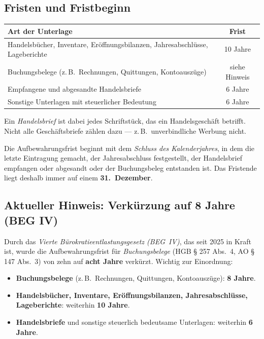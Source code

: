 \documentclass[11pt, a4paper]{article}
\begin{document}
\subsection{Fristen und Fristbeginn}

\begin{center}
\begin{tabular}{p{8.6cm} c}
\toprule
\textbf{Art der Unterlage} & \textbf{Frist}\\
\midrule
Handelsbücher, Inventare, Eröffnungsbilanzen, Jahresabschlüsse, Lageberichte & 10 Jahre\\
Buchungsbelege (z.\,B.\ Rechnungen, Quittungen, Kontoauszüge) & siehe Hinweis\\
Empfangene und abgesandte Handelsbriefe & 6 Jahre\\
Sonstige Unterlagen mit steuerlicher Bedeutung & 6 Jahre\\
\bottomrule
\end{tabular}
\end{center}

\medskip
Ein \emph{Handelsbrief} ist dabei jedes Schriftstück, das ein Handelsgeschäft betrifft.
Nicht alle Geschäftsbriefe zählen dazu --- z.\,B.\ unverbindliche Werbung nicht.

\begin{merksatz}[title={\bfseries Wichtig: Fristbeginn}]
Die Aufbewahrungsfrist beginnt mit dem \emph{Schluss des Kalenderjahres}, in dem die
letzte Eintragung gemacht, der Jahresabschluss festgestellt, der Handelsbrief empfangen
oder abgesandt oder der Buchungsbeleg entstanden ist. Das Fristende liegt deshalb immer
auf einem \textbf{31.\ Dezember}.
\end{merksatz}

\subsection{Aktueller Hinweis: Verkürzung auf 8 Jahre (BEG IV)}

Durch das \emph{Vierte Bürokratieentlastungsgesetz (BEG~IV)}, das seit 2025 in Kraft ist,
wurde die Aufbewahrungsfrist für \emph{Buchungsbelege} (HGB § 257 Abs.~4, AO § 147 Abs.~3)
von zehn auf \textbf{acht Jahre} verkürzt. Wichtig zur Einordnung:

\begin{itemize}
  \item \textbf{Buchungsbelege} (z.\,B.\ Rechnungen, Quittungen, Kontoauszüge): \textbf{8 Jahre}.
  \item \textbf{Handelsbücher, Inventare, Eröffnungsbilanzen, Jahresabschlüsse, Lageberichte}:
    weiterhin \textbf{10 Jahre}.
  \item \textbf{Handelsbriefe} und sonstige steuerlich bedeutsame Unterlagen: weiterhin
    \textbf{6 Jahre}.
\end{itemize}
\end{document}
